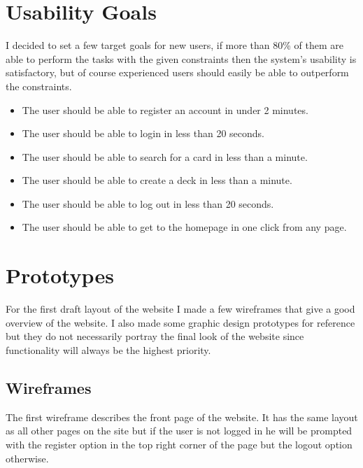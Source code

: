 \documentclass[paper=a4, fontsize=11pt]{scrartcl} %
\numberwithin{equation}{section} %
\numberwithin{figure}{section} %
\numberwithin{table}{section} %
\begin{document}
\section{Usability Goals}
I decided to set a few target goals for new users, if more than 80\% of them are able to perform the tasks with the given constraints then the system’s usability is satisfactory, but of course experienced users should easily be able to outperform the constraints.
\begin{itemize}
  \item The user should be able to register an account in under 2 minutes.
  \item The user should be able to login in less than 20 seconds.
  \item The user should be able to search for a card in less than a minute.
  \item The user should be able to create a deck in less than a minute.
  \item The user should be able to log out in less than 20 seconds.
  \item The user should be able to get to the homepage in one click from any page.
\end{itemize}

\section{Prototypes}
For the first draft layout of the website I made a few wireframes that give a good overview of the website. I also made some graphic design prototypes for reference but they do not necessarily portray the final look of the website since functionality will always be the highest priority.
\subsection{Wireframes}
The first wireframe describes the front page of the website. It has the same layout as all other pages on the site but if the user is not logged in he will be prompted with the register option in the top right corner of the page but the logout option otherwise.
\begin{center}
\end{center}
\clearpage
\end{document}
